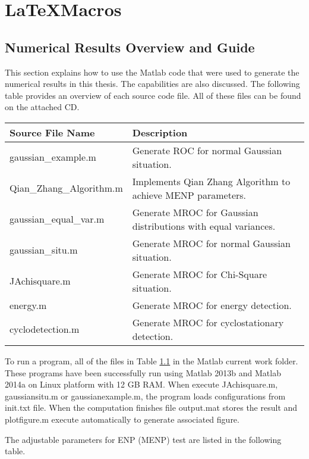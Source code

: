 \resetdatestamp

\chapter{\LaTeX{}Macros}
\label{A:LaTeXmacros}

\section{Numerical Results Overview and Guide }
This section explains how to use the Matlab code that were used to generate the numerical results in this thesis. The capabilities are also discussed. The following table provides an overview of each source code file. All of these files can be found on the attached CD. 

\begin{table}[h]
\begin{tabular}{ll}
\hline
\hline
Source File Name                  & Description                                                                \\ \hline
gaussian\_example.m      & Generate ROC for normal Gaussian situation.              \\
Qian\_Zhang\_Algorithm.m & Implements Qian Zhang Algorithm to achieve MENP parameters.                \\
gaussian\_equal\_var.m   & Generate MROC for Gaussian distributions with equal variances. \\
gaussian\_situ.m         & Generate MROC for normal Gaussian situation.                   \\
JAchisquare.m            & Generate MROC for Chi-Square situation.                        \\
energy.m                 & Generate MROC for energy detection.                            \\
cyclodetection.m         & Generate MROC for cyclostationary detection.                  
\hline
\end{tabular}
\label{filelist}
\end{table}

To run a program, all of the files in Table \ref{filelist} in the Matlab current work folder. These programs have been successfully run using Matlab 2013b and Matlab 2014a on Linux platform with 12 GB RAM.  When execute JAchisquare.m, gaussiansitu.m or gaussianexample.m, the program loads configurations from init.txt file. When the computation finishes file output.mat stores the result and plotfigure.m execute automatically to generate associated figure. 

The adjustable parameters for ENP (MENP) test are listed in the following table. 
